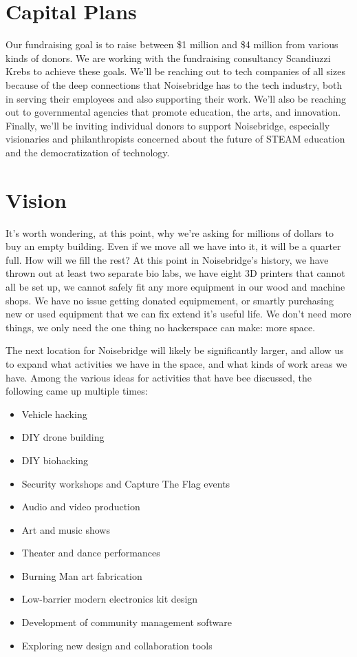\documentclass[12pt]{article}
\begin{document}
\section{Capital Plans}

Our fundraising goal is to raise between \$1 million and \$4 million from various kinds of donors. We are working with the fundraising consultancy Scandiuzzi Krebs to achieve these goals. We'll be reaching out to tech companies of all sizes because of the deep connections that Noisebridge has to the tech industry, both in serving their employees and also supporting their work. We'll also be reaching out to governmental agencies that promote education, the arts, and innovation. Finally, we'll be inviting individual donors to support Noisebridge, especially visionaries and philanthropists concerned about the future of STEAM education and the democratization of technology.





\section{Vision}

It's worth wondering, at this point, why we're asking for millions of dollars to buy an empty building.  Even if we move all we have into it, it will be a quarter full. How will we fill the rest? At this point in Noisebridge's history, we have thrown out at least two separate bio labs, we have eight 3D printers that cannot all be set up, we cannot safely fit any more equipment in our wood and machine shops. We have no issue getting donated equipmement, or smartly purchasing new or used equipment that we can fix extend it's useful life. We don't need more things, we only need the one thing no hackerspace can make: more space.

The next location for Noisebridge will likely be significantly larger, and allow us to expand what activities we have in the space, and what kinds of work areas we have. Among the various ideas for activities that have bee discussed, the following came up multiple times:

\begin{itemize}
    \item Vehicle hacking
    \item DIY drone building
    \item DIY biohacking
    \item Security workshops and Capture The Flag events
    \item Audio and video production
    \item Art and music  shows
    \item Theater and dance performances
    \item Burning Man art fabrication
    \item Low-barrier modern electronics kit design
    \item Development of community management software
    \item Exploring new design and collaboration tools
\end{itemize}
\end{document}
